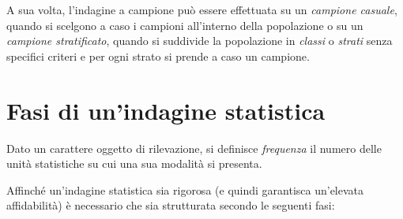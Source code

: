 A sua volta, l'indagine a campione può essere effettuata su un \emph{campione casuale}, quando si scelgono a caso i campioni all'interno della popolazione o
su un \emph{campione stratificato}, quando si suddivide la popolazione in \emph{classi} o \emph{strati} senza specifici criteri e per ogni strato si prende a caso un campione.

\ovalbox{\risolvi \ref{ese:A.1}}

\section{Fasi di un'indagine statistica}
\begin{definizione}
Dato un carattere oggetto di rilevazione, si definisce \emph{frequenza} il numero delle unità statistiche su cui una sua modalità si presenta.
\end{definizione}

Affinché un'indagine statistica sia rigorosa (e quindi garantisca un'elevata affidabilità) è necessario che sia strutturata secondo le seguenti fasi:

